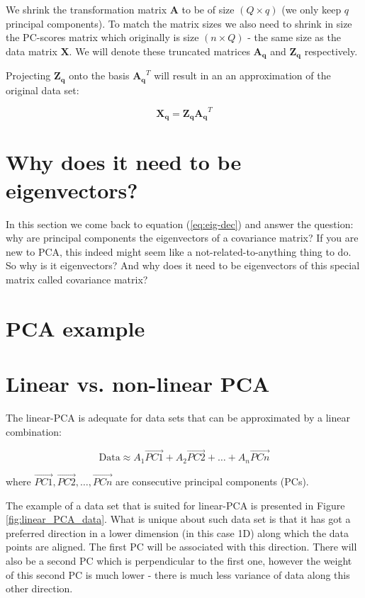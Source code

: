 \documentclass[10pt,twocolumn]{article}
\begin{document}
We shrink the transformation matrix $\bm{A}$ to be of size $(Q \times q)$ (we only keep $q$ principal components). To match the matrix sizes we also need to shrink in size the PC-scores matrix which originally is size $(n \times Q)$ - the same size as the data matrix $\bm{X}$. We will denote these truncated matrices $\bm{A_q}$ and $\bm{Z_q}$ respectively.

Projecting $\bm{Z_q}$ onto the basis $\bm{A_q}^T$ will result in an an approximation of the original data set:

\begin{equation}
\bm{X_q} = \bm{Z_q} \bm{A_q}^T
\end{equation}

\section{Why does it need to be eigenvectors?}

In this section we come back to equation (\ref{eq:eig-dec}) and answer the question: why are principal components the eigenvectors of a covariance matrix? If you are new to PCA, this indeed might seem like a not-related-to-anything thing to do. So why is it eigenvectors? And why does it need to be eigenvectors of this special matrix called covariance matrix?

\section{PCA example}

\section{Linear vs. non-linear PCA}

The linear-PCA is adequate for data sets that can be approximated by a linear combination:

\begin{equation}
\text{Data} \approx A_1 \vec{PC1} + A_2 \vec{PC2} + \dots + A_n \vec{PCn}
\end{equation}

where $\vec{PC1}, \vec{PC2}, \dots, \vec{PCn}$ are consecutive principal components (PCs).

The example of a data set that is suited for linear-PCA is presented in Figure \ref{fig:linear_PCA_data}. What is unique about such data set is that it has got a preferred direction in a lower dimension (in this case 1D) along which the data points are aligned. The first PC will be associated with this direction. There will also be a second PC which is perpendicular to the first one, however the weight of this second PC is much lower - there is much less variance of data along this other direction.
\end{document}
